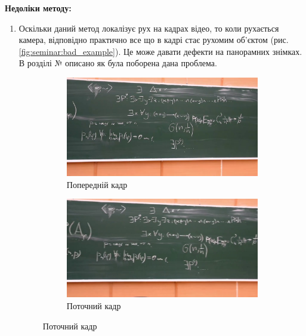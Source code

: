 \textbf{Недоліки методу:}
\begin{enumerate}
    \item Оскільки даний метод локалізує рух на кадрах відео, то коли
          рухається камера, відповідно практично все що в кадрі стає рухомим об'єктом (рис.
          \ref{fig:seminar:bad_example}). Це може давати дефекти на панорамних знімках. В
          розділі № описано як була поборена дана проблема.
          \begin{figure}[H]
              \centering
              \begin{subfigure}[c]{0.4\textwidth}
                  \centering
                  \includegraphics[width=\textwidth]{images/bad_example_1}
                  \caption{Попередній кадр
                      \label{fig:seminar:bad_example:a}
                  }
              \end{subfigure}
              \begin{subfigure}[c]{0.4\textwidth}
                  \centering
                  \includegraphics[width=\textwidth]{images/bad_example_2}
                  \caption{Поточний кадр
                      \label{fig:seminar:bad_example:b}
}
\end{subfigure}
\end{figure}
\end{enumerate}
